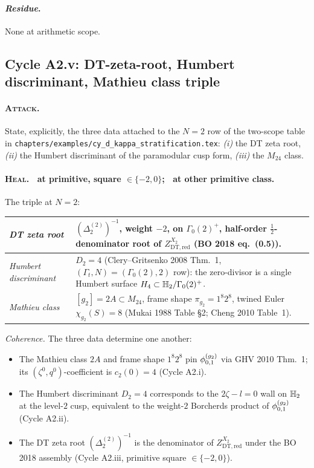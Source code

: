\paragraph{\emph{Residue}.} None at arithmetic scope.

\subsection{Cycle A2.v: DT-zeta-root, Humbert discriminant, Mathieu class
triple}
\label{subsec:a2-cycle-v}

\paragraph{\textsc{Attack}.}
State, explicitly, the three data attached to the $N = 2$ row of
the two-scope table in
\texttt{chapters/examples/cy\_d\_kappa\_stratification.tex}:
\emph{(i)} the DT zeta root, \emph{(ii)} the Humbert discriminant of the
paramodular cusp form, \emph{(iii)} the $M_{24}$ class.

\paragraph{\textsc{Heal}. \ClaimStatusTheorem\ at primitive, square
$\in\{-2, 0\}$; \ClaimStatusConjectured\ at other primitive class.}
The triple at $N = 2$:

\begin{center}
\renewcommand{\arraystretch}{1.25}
\begin{tabular}{l|l}
\hline
\emph{DT zeta root} & $(\Delta_2^{(2)})^{-1}$, weight $-2$,
  on $\Gamma_0(2)^+$, half-order $\frac{1}{2}$-denominator root of
  $Z^{X_2}_{\mathrm{DT,red}}$ (BO 2018 eq.~(0.5)). \\
\hline
\emph{Humbert discriminant} & $D_2 = 4$ (Clery--Gritsenko 2008 Thm.~1,
  $(\Gamma_t, N) = (\Gamma_0(2), 2)$ row): the zero-divisor is a single
  Humbert surface $H_4 \subset \mathbb{H}_2/\Gamma_0(2)^+$. \\
\hline
\emph{Mathieu class} & $[g_2] = 2A \subset M_{24}$, frame shape
  $\pi_{g_2} = 1^{8} 2^{8}$, twined Euler $\chi_{g_2}(S) = 8$
  (Mukai 1988 Table \S 2; Cheng 2010 Table~1). \\
\hline
\end{tabular}
\end{center}

\emph{Coherence.} The three data determine one another:
\begin{itemize}
\item The Mathieu class $2A$ and frame shape $1^{8}2^{8}$ pin
  $\phi^{(g_2)}_{0,1}$ via GHV 2010 Thm.~1; its $(\zeta^0, q^0)$-coefficient
  is $c_2(0) = 4$ (Cycle A2.i).
\item The Humbert discriminant $D_2 = 4$ corresponds to the
  $2\zeta - l = 0$ wall on $\mathbb{H}_2$ at the level-$2$ cusp, equivalent
  to the weight-$2$ Borcherds product of $\phi^{(g_2)}_{0,1}$ (Cycle A2.ii).
\item The DT zeta root $(\Delta_2^{(2)})^{-1}$ is the denominator
  of $Z^{X_2}_{\mathrm{DT,red}}$ under the BO 2018 assembly
  (Cycle A2.iii, primitive square $\in\{-2, 0\}$).
\end{itemize}

